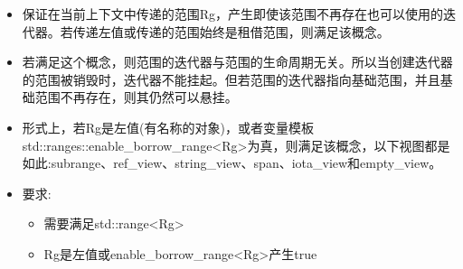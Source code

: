 
\begin{itemize}
\item
保证在当前上下文中传递的范围Rg，产生即使该范围不再存在也可以使用的迭代器。若传递左值或传递的范围始终是租借范围，则满足该概念。

\item
若满足这个概念，则范围的迭代器与范围的生命周期无关。所以当创建迭代器的范围被销毁时，迭代器不能挂起。但若范围的迭代器指向基础范围，并且基础范围不再存在，则其仍然可以悬挂。

\item
形式上，若Rg是左值(有名称的对象)，或者变量模板std::ranges::enable\_borrow\_range<Rg>为真，则满足该概念，以下视图都是如此:subrange、ref\_view、string\_view、span、iota\_view和empty\_view。

\item
要求:

\begin{itemize}
\item
需要满足std::range<Rg>

\item
Rg是左值或enable\_borrow\_range<Rg>产生true
\end{itemize}
\end{itemize}


